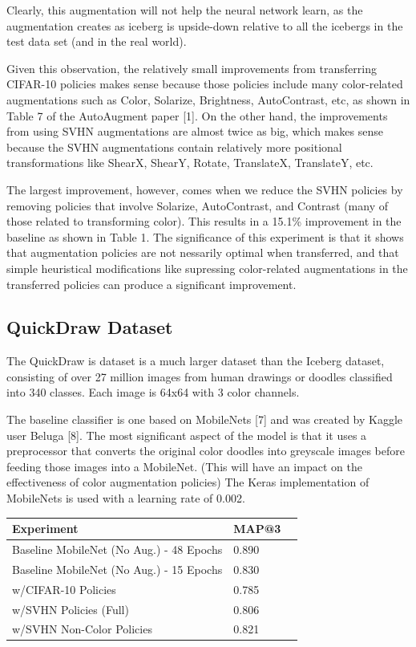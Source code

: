 \documentclass[10pt,twocolumn,letterpaper]{article}
\begin{document}
Clearly, this augmentation will not help the neural network learn, as the augmentation creates as iceberg is upside-down relative to all the icebergs in the test data set (and in the real world). 

Given this observation, the relatively small improvements from transferring CIFAR-10 policies makes sense because those policies include many color-related augmentations such as Color, Solarize, Brightness, AutoContrast, etc, as shown in Table 7 of the AutoAugment paper [1].  On the other hand, the improvements from using SVHN augmentations are almost twice as big, which makes sense because the SVHN augmentations contain relatively more positional transformations like ShearX, ShearY, Rotate, TranslateX, TranslateY, etc.

The largest improvement, however, comes when we reduce the SVHN policies by removing policies that involve Solarize, AutoContrast, and Contrast (many of those related to transforming color).  This results in a 15.1\% improvement in the baseline as shown in Table 1.  The significance of this experiment is that it shows that augmentation policies are not nessarily optimal when transferred, and that simple heuristical modifications like supressing color-related augmentations in the transferred policies can produce a significant improvement.


\subsection{QuickDraw Dataset}

The QuickDraw is dataset is a much larger dataset than the Iceberg dataset, consisting of over 27 million images from human drawings or doodles classified into 340 classes.  Each image is 64x64 with 3 color channels.  

The baseline classifier is one based on MobileNets [7] and was created by Kaggle user Beluga [8].  The most significant aspect of the model is that it uses a preprocessor that converts the original color doodles into greyscale images before feeding those images into a MobileNet.  (This will have an impact on the effectiveness of color augmentation policies)  The Keras implementation of MobileNets is used with a learning rate of 0.002.


    \begin{table}[h]
      \begin{tabular}{lll}
        \hline
        Experiment &MAP@3    \\ \hline
        Baseline MobileNet (No Aug.) - 48 Epochs  &0.890 \\
        Baseline MobileNet (No Aug.) - 15 Epochs  &0.830 \\        
        w/CIFAR-10 Policies &0.785  \\ 
        w/SVHN Policies (Full) &0.806  \\
        w/SVHN Non-Color Policies &0.821  \\  
        \hline
      \end{tabular}
    \end{table}
\end{document}
